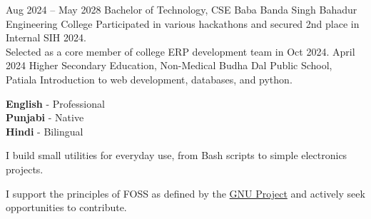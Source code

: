 \documentclass[9pt]{developercv} %
\begin{document}


\begin{entrylist}
	\entry
		{Aug 2024 -- May 2028}
		{Bachelor of Technology, CSE}
		{Baba Banda Singh Bahadur Engineering College}
		{Participated in various hackathons and secured 2nd place in Internal SIH
		2024.\\Selected as a core member of college ERP development team in Oct 2024.}
	\entry
		{April 2024}
		{Higher Secondary Education, Non-Medical}
		{Budha Dal Public School, Patiala}
		{Introduction to web development, databases, and python.}
\end{entrylist}


\begin{minipage}[t]{0.2\textwidth} %
	\vspace{-\baselineskip} %


	\textbf{English} - Professional\\
	\textbf{Punjabi} - Native\\
	\textbf{Hindi} - Bilingual
\end{minipage}
\hfill %
\begin{minipage}[t]{0.3\textwidth} %
	\vspace{-\baselineskip} %


	I build small utilities for everyday use, from Bash scripts to simple
	electronics projects.
\end{minipage}
\hfill %
\begin{minipage}[t]{0.3\textwidth} %
	\vspace{-\baselineskip} %


	I support the principles of FOSS as defined by the
	\href{https://www.gnu.org/philosophy/free-sw.en.html}{GNU Project} and
	actively seek opportunities to contribute.
\end{minipage}

\end{document}
